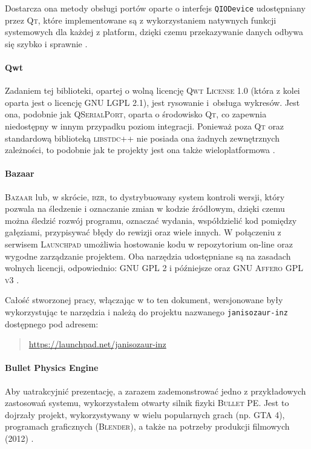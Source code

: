 Dostarcza ona metody obsługi portów oparte o interfejs \verb|QIODevice| udostępniany przez \textsc{Qt}, które implementowane są z wykorzystaniem natywnych funkcji systemowych dla każdej z platform, dzięki czemu przekazywanie danych odbywa się szybko i sprawnie \citep{QSP}.

\paragraph{Qwt}
Zadaniem tej biblioteki, opartej o wolną licencję \textsc{Qwt License 1.0} (która z kolei oparta jest o licencję \textsc{GNU LGPL 2.1}), jest rysowanie i~obsługa wykresów. Jest ona, podobnie jak \textsc{QSerialPort}, oparta o środowisko \textsc{Qt}, co zapewnia niedostępny w innym przypadku poziom integracji. Ponieważ poza \textsc{Qt} oraz standardową biblioteką \textsc{libstdc++} nie posiada ona żadnych zewnętrznych zależności, to podobnie jak te projekty jest ona także wieloplatformowa \citep{QWT}.

\paragraph{Bazaar}
\textsc{Bazaar} lub, w skrócie, \textsc{bzr}, to dystrybuowany system kontroli wersji, który pozwala na śledzenie i oznaczanie zmian w kodzie źródłowym, dzięki czemu można śledzić rozwój programu, oznaczać wydania, współdzielić kod pomiędzy gałęziami,  przypisywać błędy do rewizji oraz wiele innych. W połączeniu z serwisem \textsc{Launchpad} umożliwia hostowanie kodu w repozytorium on-line oraz wygodne zarządzanie projektem. Oba narzędzia udostępniane są na zasadach wolnych licencji, odpowiednio: \textsc{GNU GPL 2} i późniejsze oraz \textsc{GNU Affero GPL v3} \citep{BZR}.

Całość stworzonej pracy, włączając w to ten dokument, wersjonowane były wykorzystując te narzędzia i należą do projektu nazwanego \texttt{janisozaur-inz} dostępnego pod adresem:
\begin{verse}
  \url{https://launchpad.net/janisozaur-inz}
\end{verse}

\paragraph{Bullet Physics Engine}
Aby uatrakcyjnić prezentację, a zarazem zademonstrować jedno z przykładowych zastosowań systemu, wykorzystałem otwarty silnik fizyki \textsc{Bullet PE}. Jest to dojrzały projekt, wykorzystywany w wielu popularnych grach (np. \textsc{GTA 4}), programach graficznych (\textsc{Blender}), a także na potrzeby produkcji filmowych (\textsc{2012}) \citep{BPE}.

